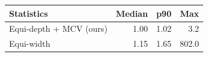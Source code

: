 \begin{tabular}{lrrr}
\toprule
Statistics & Median & p90 & Max \\
\midrule
Equi-depth + MCV (ours) & 1.00 & 1.02 & 3.2 \\
Equi-width & 1.15 & 1.65 & 802.0 \\
\bottomrule
\end{tabular}
